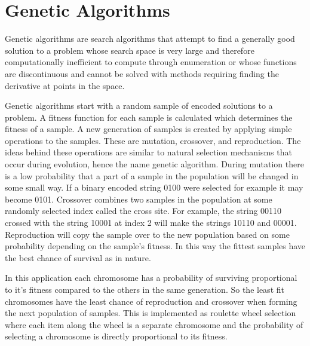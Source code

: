 \chapter[Genetic Algorithms]{Genetic Algorithms}
Genetic algorithms are search algorithms that attempt to find a generally good solution to a problem whose search space
is very large and therefore computationally inefficient to compute through enumeration or whose functions are discontinuous and cannot
be solved with methods requiring finding the derivative at points in the space. 

Genetic algorithms start with a random sample of encoded solutions to a problem. A fitness function for each sample is calculated which determines the fitness of a sample. A new generation of samples is created by applying simple operations to the samples. These are mutation, crossover, and reproduction. The ideas behind these operations are similar to natural selection mechanisms that occur during evolution, hence the name genetic algorithm. During mutation there is a low probability that a part of a sample in the population will be changed in some small way. If a binary encoded string 0100 were selected for example it may become 0101. Crossover combines two samples in the population at some randomly selected index called the cross site. For example, the string 00110 crossed with the string 10001 at index 2 will make the strings 10110 and 00001. Reproduction will copy the sample over to the new population based on some probability depending on the sample's fitness. In this way the fittest samples have the best chance of survival as in nature.

 In this application each chromosome has a probability of surviving proportional to it's fitness compared to the others in the same generation. So the least fit chromosomes have the least chance of reproduction and crossover when forming the next population of samples. This is implemented as roulette wheel selection where each item along the wheel is a separate chromosome and the probability of selecting a chromosome is directly proportional to its fitness.    

